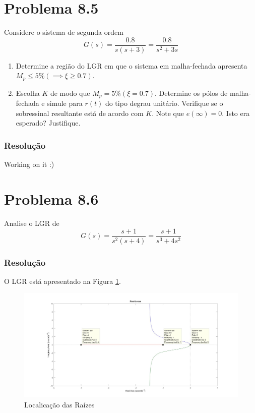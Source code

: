 \documentclass[
]{book}
\providecommand{\tightlist}{%
  \setlength{\itemsep}{0pt}\setlength{\parskip}{0pt}}
\theoremstyle{definition}
\theoremstyle{definition}
\theoremstyle{definition}
\theoremstyle{remark}
\begin{document}
\hypertarget{problema-8.5}{%
\section*{Problema 8.5}\label{problema-8.5}}

Considere o sistema de segunda ordem
\[
G(s) = \frac{0.8}{s(s+3)} = \frac{0.8}{s^2 + 3s}
\]

\begin{enumerate}
\def\labelenumi{\alph{enumi}.}
\tightlist
\item
  Determine a região do LGR em que o sistema em malha-fechada apresenta \(M_p \leq 5\% (\implies \xi \geq 0.7)\).
\item
  Escolha \(K\) de modo que \(M_p = 5\% (\xi = 0.7)\). Determine os pólos de malha-fechada e simule para \(r(t)\) do tipo degrau unitário. Verifique se o sobressinal resultante está de acordo com \(K\). Note que \(e(\infty)=0\). Isto era esperado? Justifique.
\end{enumerate}

\hypertarget{resoluuxe7uxe3o-26}{%
\subsubsection*{Resolução}\label{resoluuxe7uxe3o-26}}

Working on it :)

\hypertarget{problema-8.6}{%
\section*{Problema 8.6}\label{problema-8.6}}

Analise o LGR de
\[
G(s) = \frac{s+1}{s^2(s+4)} = \frac{s+1}{s^3+4s^2}
\]

\hypertarget{resoluuxe7uxe3o-27}{%
\subsubsection*{Resolução}\label{resoluuxe7uxe3o-27}}

O LGR está apresentado na Figura \ref{fig:fig8R8}.

\begin{figure}

{\centering \includegraphics{Imagens/Lab8/Resolução/fig8} 

}

\caption{Localicação das Raízes}\label{fig:fig8R8}
\end{figure}
\end{document}
